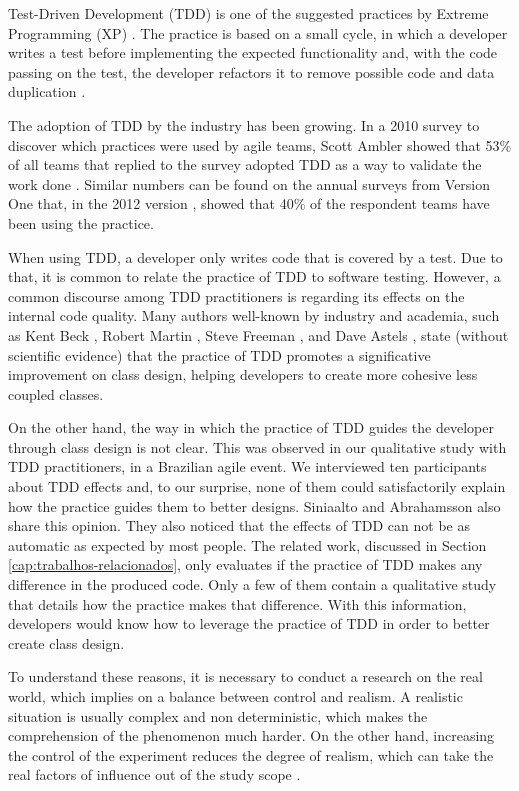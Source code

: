 \documentclass[times]{speauth}
\begin{document}
Test-Driven Development (TDD) is one of the suggested practices
by Extreme Programming (XP) \cite{XPExplained}. The practice is based on
a small cycle, in which a developer writes a test before implementing
the expected functionality and, with the code passing on the
test, the developer refactors it to remove possible code 
and data duplication \cite{TDDByExample}.

The adoption of TDD by the industry has been growing. In a 2010 survey to discover
which practices were used by agile teams, Scott Ambler showed that 53\% of all teams
that replied to the survey adopted TDD as a way to validate the work done
\cite{wambler-survey-agile}. Similar numbers can be found on the annual surveys from
Version One that, in the 2012 version \cite{versionone-2012}, showed that
40\% of the respondent teams have been using the practice.

When using TDD, a developer only writes code that is covered by a test. Due
to that, it is common to relate the practice of TDD to software testing. However,
a common discourse among TDD practitioners is regarding its effects on the internal code quality.
Many authors well-known by industry and academia, such as Kent Beck \cite{TDDByExample}, 
Robert Martin \cite{agile-ppp}, Steve Freeman \cite{GOOS}, and Dave Astels \cite{astels-tdd}, 
state (without scientific evidence) that the practice of TDD promotes a significative
improvement on class design, helping developers to create more cohesive less coupled
classes.

On the other hand, the way in which the practice of TDD guides the developer
through class design is not clear. This was observed in our qualitative study
with TDD practitioners, in a Brazilian agile event. We interviewed
ten participants about TDD effects \cite{aniche-wbma} and, to our surprise,
none of them could satisfactorily explain how the practice guides them to better
designs.
Siniaalto and Abrahamsson \cite{alarming-results} also share this opinion. They also
noticed that the effects of TDD can not be as automatic as expected by most people.
The related work, discussed in Section \ref{cap:trabalhos-relacionados},
only evaluates if the practice of TDD makes any difference in the produced code. Only a few
of them contain a qualitative study that details how the practice makes that difference.
With this information, developers would know how to leverage the practice of TDD in order to 
better create class design.

To understand these reasons, it is necessary to conduct a research on the real world, which
implies on a balance between control and realism. A realistic situation is usually
complex and non deterministic, which makes the comprehension of the phenomenon much
harder. On the other hand, increasing the control of the experiment reduces the
degree of realism, which can take the real factors of influence out of the study
scope \cite{guidelines-case-study}.
\end{document}
